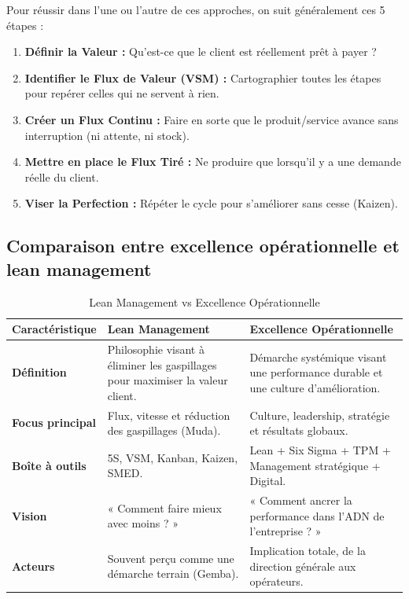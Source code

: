 \documentclass[11pt,a4paper]{article}
\begin{document}
Pour réussir dans l'une ou l'autre de ces approches, on suit généralement ces 5 étapes :

\begin{enumerate}[leftmargin=*,itemsep=0.5em]
  \item \textbf{Définir la Valeur :} Qu'est-ce que le client est réellement prêt à payer ?
  
  \item \textbf{Identifier le Flux de Valeur (VSM) :} Cartographier toutes les étapes pour repérer celles qui ne servent à rien.
  
  \item \textbf{Créer un Flux Continu :} Faire en sorte que le produit/service avance sans interruption (ni attente, ni stock).
  
  \item \textbf{Mettre en place le Flux Tiré :} Ne produire que lorsqu'il y a une demande réelle du client.
  
  \item \textbf{Viser la Perfection :} Répéter le cycle pour s'améliorer sans cesse (Kaizen).
\end{enumerate}

\subsection{Comparaison entre excellence opérationnelle et lean management}

\begin{table}[H]
\centering
\small
\begin{tabular}{@{}>{\bfseries}l>{\raggedright\arraybackslash}p{}>{\raggedright\arraybackslash}p{}@{}}
\toprule
\rowcolor{tableheader}
\color{white}\textbf{Caractéristique} & \color{white}\textbf{Lean Management} & \color{white}\textbf{Excellence Opérationnelle} \\
\midrule
Définition & Philosophie visant à éliminer les gaspillages pour maximiser la valeur client. & Démarche systémique visant une performance durable et une culture d'amélioration. \\
\rowcolor{lightgray}
Focus principal & Flux, vitesse et réduction des gaspillages (Muda). & Culture, leadership, stratégie et résultats globaux. \\
Boîte à outils & 5S, VSM, Kanban, Kaizen, SMED. & Lean + Six Sigma + TPM + Management stratégique + Digital. \\
\rowcolor{lightgray}
Vision & « Comment faire mieux avec moins ? » & « Comment ancrer la performance dans l'ADN de l'entreprise ? » \\
Acteurs & Souvent perçu comme une démarche terrain (Gemba). & Implication totale, de la direction générale aux opérateurs. \\
\bottomrule
\end{tabular}
\caption{Lean Management vs Excellence Opérationnelle}
\end{table}
\end{document}
